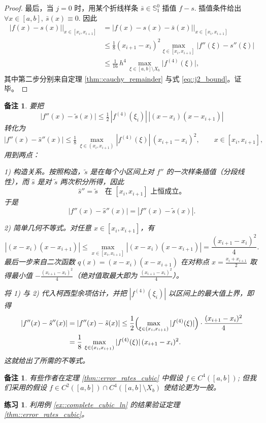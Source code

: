 \documentclass[a4paper]{ctexart}
\newtheorem{remark}{备注}
\newtheorem*{remark*}{备注}
\newtheorem{exercise}[theorem]{练习}
\numberwithin{theorem}{section}
\numberwithin{equation}{section}
\numberwithin{figure}{section}
\numberwithin{remark}{section}
\begin{document}
\begin{proof}
最后，当 $j=0$ 时，用某个折线样条 $\bar{s}\in\mathbb{S}_1^{0}$ 插值 $f-s$. 
插值条件给出
$\forall x\in[a,b],\ \bar{s}(x)\equiv 0$. 因此
\begin{align*}
\bigl|f(x)-s(x)\bigr|\big|_{x\in[x_i,x_{i+1}]}
&=\bigl|f(x)-s(x)-\bar{s}(x)\bigr|\big|_{x\in[x_i,x_{i+1}]}\nonumber\\
&\le \frac{1}{8}(x_{i+1}-x_i)^2
\max_{\xi\in[x_i,x_{i+1}]}\bigl|f''(\xi)-s''(\xi)\bigr| \nonumber\\
&\le \frac{1}{16}\,h^{4}\,
\max_{\xi\in[a,b]\setminus X_b}\bigl|f^{(4)}(\xi)\bigr|,
\end{align*}
其中第二步分别来自定理 \ref{thm::cauchy_remainder} 
与式 \eqref{eq::j2_bound}。证毕。
\end{proof}

\begin{remark*}
    要把
\[
\bigl|f''(x)-\tilde{s}(x)\bigr|
\le \tfrac12\,|f^{(4)}(\xi_i)|\,|(x-x_i)(x-x_{i+1})|
\]
转化为
\[
\bigl|f''(x)-\hat{s}''(x)\bigr|
\le \tfrac18\,
\max_{\xi\in(x_i,x_{i+1})}|f^{(4)}(\xi)|\,(x_{i+1}-x_i)^2,
\qquad x\in[x_i,x_{i+1}],
\]
用到两点：

1) 构造关系。按照构造，$\tilde{s}$ 是在每个小区间上对 $f''$ 的一次样条插值（分段线性），而 $\hat{s}$ 是对 $\tilde{s}$ 两次积分所得，因此
\[
\hat{s}''=\tilde{s}\quad\text{在 }[x_i,x_{i+1}] \text{ 上恒成立。}
\]
于是
\[
|f''(x)-\hat{s}''(x)|=|f''(x)-\tilde{s}(x)|.
\]

2) 简单几何不等式。对任意 $x\in[x_i,x_{i+1}]$，有
\[
|(x-x_i)(x-x_{i+1})|
\le \max_{x\in[x_i,x_{i+1}]}|(x-x_i)(x-x_{i+1})|
=\frac{(x_{i+1}-x_i)^2}{4}.
\]
最后一步来自二次函数
$q(x)=(x-x_i)(x-x_{i+1})$
在对称点 $x=\tfrac{x_i+x_{i+1}}{2}$ 取得最小值 $-\tfrac{(x_{i+1}-x_i)^2}{4}$（绝对值取最大即为 $\tfrac{(x_{i+1}-x_i)^2}{4}$）。

将 1) 与 2) 代入柯西型余项估计，并把 $|f^{(4)}(\xi_i)|$ 以区间上的最大值上界，即得
\[
\begin{aligned}
|f''(x)-\hat{s}''(x)|
&=|f''(x)-\tilde{s}(x)|
\le \frac12
\Bigl(\max_{\xi\in(x_i,x_{i+1})}|f^{(4)}(\xi)|\Bigr)
\cdot \frac{(x_{i+1}-x_i)^2}{4} \\
&=\frac18\,\max_{\xi\in(x_i,x_{i+1})}|f^{(4)}(\xi)|\,(x_{i+1}-x_i)^2.
\end{aligned}
\]
这就给出了所需的不等式。
\end{remark*}

\begin{remark}
    \label{rem::assumption_c4_general}
有些作者在定理 \ref{thm::error_rates_cubic} 中假设 $f\in C^{4}([a,b])$; 
但我们采用的假设 $f\in C^{2}([a,b])\cap C^{4}([a,b]\setminus X_b)$ 
使结论更为一般。
\end{remark}

\begin{exercise}
    \label{exer::verify_thm312_by_ex38}
利用例 \ref{ex::complete_cubic_ln} 的结果验证定理 \ref{thm::error_rates_cubic}。
\end{exercise}



\end{document}
